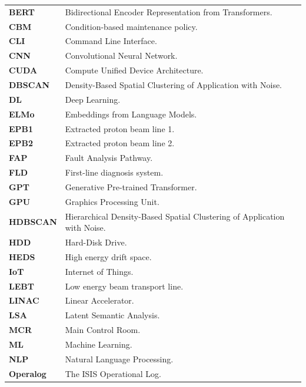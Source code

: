 \documentclass[10pt,oneside]{report}
\begin{document}
\begin{table}[ht]
    \centering
    \begin{tabular}{ll}

        \textbf{BERT} & Bidirectional Encoder Representation from Transformers. \\
        \textbf{CBM} & Condition-based maintenance policy. \\
        \textbf{CLI} & Command Line Interface. \\
        \textbf{CNN} & Convolutional Neural Network. \\
        \textbf{CUDA} & Compute Unified Device Architecture. \\
        \textbf{DBSCAN} & Density-Based Spatial Clustering of Application with Noise. \\
        \textbf{DL} & Deep Learning. \\
        \textbf{ELMo} & Embeddings from Language Models. \\
        \textbf{EPB1} & Extracted proton beam line 1. \\
        \textbf{EPB2} & Extracted proton beam line 2. \\
        \textbf{FAP} & Fault Analysis Pathway. \\
        \textbf{FLD} & First-line diagnosis system. \\
        \textbf{GPT} & Generative Pre-trained Transformer. \\
        \textbf{GPU} & Graphics Processing Unit. \\
        \textbf{HDBSCAN} & Hierarchical Density-Based Spatial Clustering of Application with Noise. \\
        \textbf{HDD} & Hard-Disk Drive. \\
        \textbf{HEDS} & High energy drift space. \\
        \textbf{IoT} & Internet of Things. \\
        \textbf{LEBT} & Low energy beam transport line. \\
        \textbf{LINAC} & Linear Accelerator. \\
        \textbf{LSA} & Latent Semantic Analysis. \\
        \textbf{MCR} & Main Control Room. \\
        \textbf{ML} & Machine Learning. \\
        \textbf{NLP} & Natural Language Processing. \\
        \textbf{Operalog} & The ISIS Operational Log. \\

\end{tabular}
\end{table}
\end{document}
